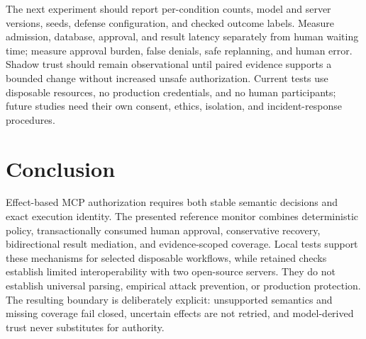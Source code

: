 \documentclass[conference,letterpaper]{IEEEtran}
\begin{document}
The next experiment should report per-condition counts, model and server versions, seeds, defense configuration, and checked outcome labels. Measure admission, database, approval, and result latency separately from human waiting time; measure approval burden, false denials, safe replanning, and human error. Shadow trust should remain observational until paired evidence supports a bounded change without increased unsafe authorization. Current tests use disposable resources, no production credentials, and no human participants; future studies need their own consent, ethics, isolation, and incident-response procedures.

\section{Conclusion}
Effect-based MCP authorization requires both stable semantic decisions and exact execution identity. The presented reference monitor combines deterministic policy, transactionally consumed human approval, conservative recovery, bidirectional result mediation, and evidence-scoped coverage. Local tests support these mechanisms for selected disposable workflows, while retained checks establish limited interoperability with two open-source servers. They do not establish universal parsing, empirical attack prevention, or production protection. The resulting boundary is deliberately explicit: unsupported semantics and missing coverage fail closed, uncertain effects are not retried, and model-derived trust never substitutes for authority.



\end{document}
